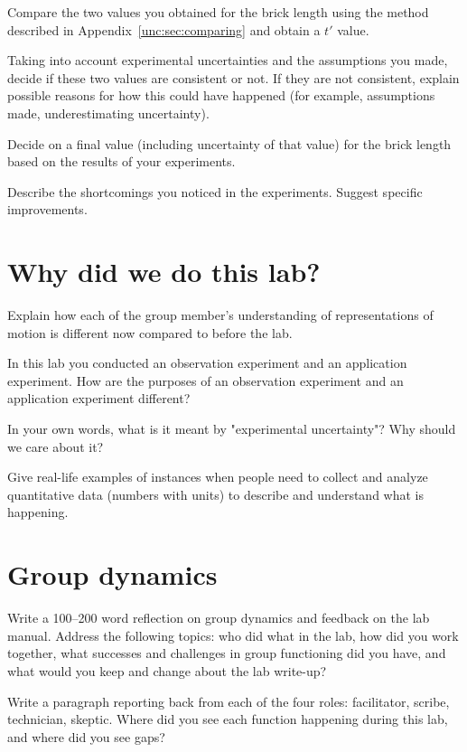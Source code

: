 \begin{steps}
	\item Compare the two values you obtained for the brick length using the method described in Appendix~\ref{unc:sec:comparing} and obtain a $t'$ value.
	
	\item Taking into account experimental uncertainties and the assumptions you made, decide if these two values are consistent or not. If they are not consistent, explain possible reasons for how this could have happened (for example, assumptions made, underestimating uncertainty).
	
	\item Decide on a final value (including uncertainty of that value) for the brick length based on the results of your experiments.

	\item Describe the shortcomings you noticed in the experiments. Suggest specific improvements.
	
\end{steps}

\section{Why did we do this lab?}

\begin{steps}
	\item Explain how each of the group member's understanding of representations of motion is different now compared to before the lab.
	
	\item In this lab you conducted an observation experiment and an application experiment. How are the purposes of an observation experiment and an application experiment different?
	
	\item In your own words, what is it meant by "experimental uncertainty"?  Why should we care about it?
	
	\item Give real-life examples of instances when people need to collect and analyze quantitative data (numbers with units) to describe and understand what is happening.
\end{steps}

\section{Group dynamics}

\begin{steps}
	\item Write a 100--200 word reflection on group dynamics and feedback on the lab manual. Address the following topics: who did what in the lab, how did you work together, what successes and challenges in group functioning did you have, and what would you keep and change about the lab write-up?
	
	\item Write a paragraph reporting back from each of the four roles: facilitator, scribe, technician, skeptic. Where did you see each function happening during this lab, and where did you see gaps?
\end{steps}

